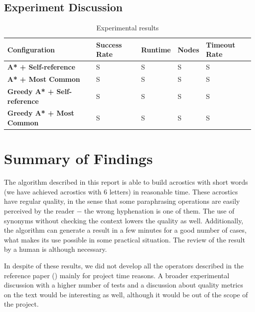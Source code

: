 \documentclass[11pt]{reportAlternative}
\begin{document}
\section{Experiment Discussion}

\begin{table}
\centering
\begin{tabular}{l | l | l | l | l}
	\hline
	\textbf{Configuration} & \textbf{Success Rate} & \textbf{Runtime} & \textbf{Nodes} & \textbf{Timeout Rate} \\ \hline
		\textbf{A* + Self-reference}	& S	& S	& S	& S \\ \hline
		\textbf{A* + Most Common}		& S	& S	& S	& S \\ \hline
		\textbf{Greedy A* + Self-reference}	& S & S	& S	& S \\ \hline
		\textbf{Greedy A* + Most Common}	& S & S	& S	& S \\
	\hline
\end{tabular}
\label{tab:results}
\caption{Experimental results}
\end{table}


\chapter{Summary of Findings}
The algorithm described in this report is able to build acrostics with short words (we have achieved acrostics with 6 letters) in reasonable time. These acrostics have regular quality, in the sense that some paraphrasing operations are easily perceived by the reader $-$ the wrong hyphenation is one of them. The use of synonyms without checking the context lowers the quality as well. Additionally, the algorithm can generate a result in a few minutes for a good number of cases, what makes its use possible in some practical situation. The review of the result by a human is although necessary. \par

In despite of these results, we did not develop all the operators described in the reference paper (\cite{Stein}) mainly for project time reasons. A broader experimental discussion with a higher number of tests and a discussion about quality metrics on the text would be interesting as well, although it would be out of the scope of the project. \par
\end{document}
